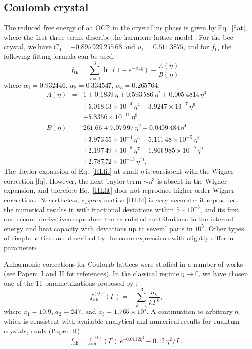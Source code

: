 \documentclass[traditabstract]{aa}
\newcommand{\beq}{\begin{equation}}
\newcommand{\eeq}{\end{equation}}
\newcommand{\bea}{\begin{eqnarray}}
\newcommand{\eea}{\end{eqnarray}}
\newcommand{\req}[1]{Eq.~\ref{#1}}
\begin{document}
\subsection{Coulomb crystal}
\label{sect:OCPsol}

The reduced free energy of an OCP in the crystalline phase
is given by \req{flat}, where the first three terms describe
the harmonic lattice model \citep{Baiko-ea01}. For the bcc
crystal, we have $C_0=-0.895\,929\,255\,68$ and
$u_1=0.511\,3875$, and for $f_\mathrm{th}$ the following
fitting formula can be used:
\beq
   f_\mathrm{th} = \sum_{k=1}^3\ln\left(1-e^{-\alpha_k\eta}\right) -
  \frac{A(\eta)}{ B(\eta)},
\label{HLfit}
\eeq
where $\alpha_1=0.932446$,
$\alpha_2=0.334547$, $\alpha_3=0.265764$,
\bea
 A(\eta) &=& 1 + 0.1839\,\eta+ 0.593\,586\,\eta^2+0.005\,4814\,\eta^3
\nonumber\\&&
   +5.018\,13\times10^{-4}\,\eta^4
   +3.9247\times10^{-7}\,\eta^6
\nonumber\\&&
   +5.8356\times10^{-11}\,\eta^8,
\nonumber
\\
B(\eta) &=& 261.66+7.079\,97\,\eta^{2}+0.0409\,484\,\eta^{4}
\nonumber\\&&
+ 3.973\,55\times10^{-4}\,\eta^{5}
+5.111\,48\times10^{-5}\,\eta^{6}
\nonumber\\&&
     +  2.197\,49\times10^{-6}\,\eta^{7}
     +1.866\,985\times10^{-9}\,\eta^{9}
\nonumber\\&&
     +2.787\,72\times10^{-13}\,\eta^{11} .
\nonumber
\eea
The Taylor expansion of \req{HLfit} at small $\eta$ is
consistent with the Wigner correction \ref{fq}. However,
the next Taylor term $\sim\eta^3$ is absent in the Wigner
expansion, and therefore \req{HLfit} does not reproduce
higher-order Wigner corrections. Nevertheless, approximation
\ref{HLfit} is very accurate: it reproduces
the numerical results in \citet{Baiko-ea01} with fractional
deviations within $5\times10^{-6}$, and its first and second
derivatives reproduce the calculated contributions to the
internal energy and heat capacity with deviations up to
several parts in $10^5$. Other types of simple lattices are
described by the same expressions with slightly different
parameters \citep[see][]{Baiko-ea01}. 

Anharmonic corrections for Coulomb lattices were
studied in a number of works (see Papers~I and II for references).
In the classical regime $\eta\to0$, we have chosen one of
the 11
parametrizations proposed by \citet{FaroukiHamaguchi}:
\beq
 f_\mathrm{ah}^{(0)}(\Gamma) = -\sum_{k=1}^3
        \frac{a_k}{k\Gamma^k},
\label{Farouki}
\eeq
where  $a_1=10.9$, $a_2=247$, and $a_3=1.765\times10^5$.
A continuation to arbitrary $\eta$, which is consistent with
available analytical and numerical results for quantum
crystals, reads (Paper~II)
\beq
      f_\mathrm{ah} = 
          f_\mathrm{ah}^{(0)}(\Gamma)\,e^{-0.0112\eta^2}
             -0.12\,\eta^2/\Gamma\,.
\label{f_ah_fit}
\eeq
\end{document}
